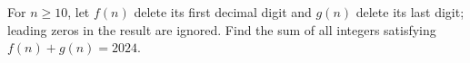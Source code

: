For $n\ge10$, let $f(n)$ delete its first decimal digit and $g(n)$ delete its last digit; leading zeros in the result are ignored. Find the sum of all integers satisfying $f(n)+g(n)=2024$.
